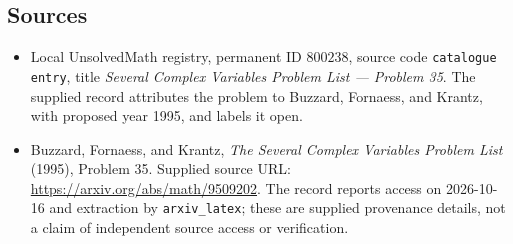 \documentclass[11pt]{article}
\begin{document}
\subsection{Sources}
\begin{itemize}
\item Local UnsolvedMath registry, permanent ID \(800238\), source code \texttt{catalogue entry}, title \emph{Several Complex Variables Problem List --- Problem 35}. The supplied record attributes the problem to Buzzard, Fornaess, and Krantz, with proposed year 1995, and labels it open.
\item Buzzard, Fornaess, and Krantz, \emph{The Several Complex Variables Problem List} (1995), Problem 35. Supplied source URL: \url{https://arxiv.org/abs/math/9509202}. The record reports access on 2026-10-16 and extraction by \texttt{arxiv\_latex}; these are supplied provenance details, not a claim of independent source access or verification.
\end{itemize}
\end{document}
